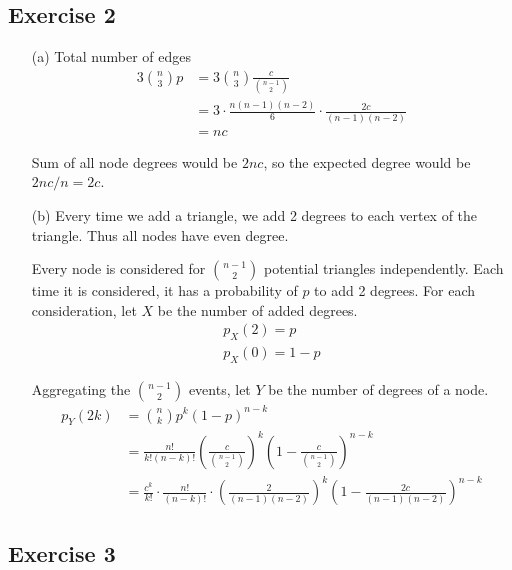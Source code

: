 \documentclass{article}
\begin{document}
\newpage

\subsection*{Exercise 2}

\begin{enumerate}
  \item[(a)]
  Total number of edges
  \begin{align*}
    3 \binom{n}{3} p &= 3 \binom{n}{3} \frac{c}{\binom{n - 1}{2}} \\
    &= 3 \cdot \frac{n(n - 1)(n - 2)}{6} \cdot \frac{2c}{(n - 1)(n - 2)} \\
    &= nc
  \end{align*}

  Sum of all node degrees would be \( 2nc \), so the expected degree would be \(
  2nc / n = \boxed{2c} \).

  \item[(b)]
  Every time we add a triangle, we add 2 degrees to each vertex of the triangle.
  Thus all nodes have even degree.

  Every node is considered for \( \binom{n - 1}{2} \) potential triangles
  independently. Each time it is considered, it has a probability of \( p \) to
  add 2 degrees. For each consideration, let \( X \) be the number of added
  degrees.
  \begin{gather*}
    p_X(2) = p \\
    p_X(0) = 1 - p
  \end{gather*}

  Aggregating the \( \binom{n - 1}{2} \) events, let \( Y \) be the number of
  degrees of a node.
  \begin{align*}
    p_Y(2k) &= \binom{n}{k} p^k (1 - p)^{n - k} \\
    &= \frac{n!}{k! (n - k)!} \left( \frac{c}{\binom{n - 1}{2}} \right)^k \left(
    1 - \frac{c}{\binom{n - 1}{2}} \right)^{n - k} \\
    &= \frac{c^k}{k!} \cdot \frac{n!}{(n - k)!} \cdot \left( \frac{2}{(n - 1)(n
    - 2)} \right)^k \left( 1 - \frac{2c}{(n - 1)(n - 2)} \right)^{n - k}
  \end{align*}
\end{enumerate}

\newpage

\subsection*{Exercise 3}
\end{document}
